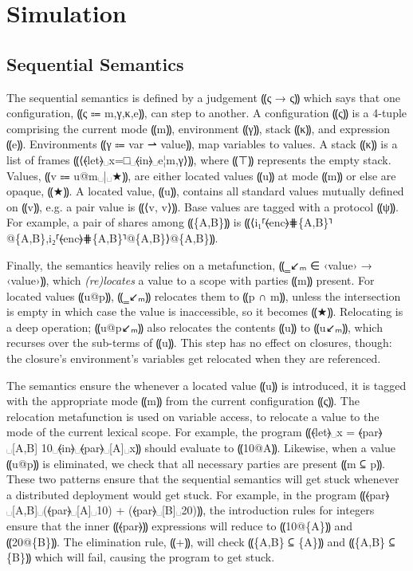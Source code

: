 \section{Simulation}
\label{sec:lam-mpc-simulation}

\subsection{Sequential Semantics}


The sequential semantics is defined by a judgement ⸨ς → ς⸩ which says that
one configuration, ⸨ς ⩴ m,γ,κ,e⸩, can step to another. A configuration
⸨ς⸩ is a 4-tuple comprising the current mode ⸨m⸩, environment ⸨γ⸩, stack
⸨κ⸩, and expression ⸨e⸩. Environments ⸨γ ⩴ var ⇀ value⸩, map variables to
values. A stack ⸨κ⸩ is a list of frames ⸨⟨⦑let⦒␣x=□␣⦑in⦒␣e¦m,γ⟩⸩, where
⸨⊤⸩ represents the empty stack. Values, ⸨v ⩴ u@m␣|␣★⸩, are either located
values ⸨u⸩ at mode ⸨m⸩ or else are opaque, ⸨★⸩. A located value, ⸨u⸩,
contains all standard values mutually defined on ⸨v⸩, e.g. a pair value is ⸨⟨v, v⟩⸩.
Base values are tagged with a protocol ⸨ψ⸩. For example, a
pair of shares among ⸨\{A,B\}⸩ is ⸨⟨i₁⸢⦑enc⦒⋕\{A,B\}⸣@\{A,B\},i₂⸢⦑enc⦒⋕\{A,B\}⸣@\{A,B\}⟩@\{A,B\}⸩.

Finally, the semantics heavily relies on a metafunction, ⸨‗↙ₘ ∈ ‹value› → ‹value›⸩, which \emph{(re)locates} a
value to a scope with parties ⸨m⸩ present. For located values ⸨u@p⸩, ⸨‗↙ₘ⸩
relocates them to ⸨p ∩ m⸩, unless the intersection is empty in which case the
value is inaccessible, so it becomes ⸨★⸩. Relocating is a deep operation;
⸨u@p↙ₘ⸩ also relocates the contents ⸨u⸩ to ⸨u↙ₘ⸩, which recurses over
the sub-terms of ⸨u⸩. This step has no effect on closures, though: the closure's
environment's variables get relocated when they are referenced.

The semantics ensure the whenever a located value ⸨u⸩ is introduced, it is tagged with
the appropriate mode ⸨m⸩ from the current configuration ⸨ς⸩. The relocation metafunction
is used on variable access, to relocate a value to the mode of the current lexical scope.
For example, the program ⸨⦑let⦒␣x = ⦑par⦒␣[A,B] 10␣⦑in⦒␣⦑par⦒␣[A]␣x⸩ should evaluate to
⸨10@{A}⸩. Likewise, when a value ⸨u@p⸩ is eliminated, we check that all necessary parties
are present ⸨m ⊆ p⸩. These two patterns ensure that the sequential semantics will get stuck
whenever a distributed deployment would get stuck. For example, in the program
⸨⦑par⦒␣[A,B]␣(⦑par⦒␣[A]␣10) + (⦑par⦒␣[B]␣20)⸩, the introduction rules for integers ensure that
the inner ⸨⦑par⦒⸩ expressions will reduce to ⸨10@\{A\}⸩ and ⸨20@\{B\}⸩. The elimination rule, ⸨+⸩,
will check ⸨\{A,B\} ⊆ \{A\}⸩ and ⸨\{A,B\} ⊆ \{B\}⸩ which will fail, causing the program to get stuck.

